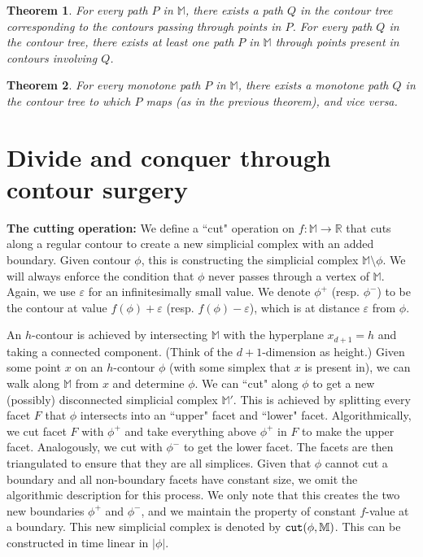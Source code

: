 \documentclass[11pt]{article}
\newtheorem{theorem}{Theorem}
\theoremstyle{definition}
\newcommand{\MM}{\mathbb{M}}
\newcommand{\RR}{\mathbb{R}}
\newcommand{\eps}{\varepsilon}
\newcommand{\cut}{{\tt cut}}
\begin{document}
\begin{theorem} \label{thm:carr-path} For every path $P$ in $\MM$, there exists a path $Q$ in the contour tree corresponding
to the contours passing through points in $P$.
For every path $Q$ in the contour tree, there exists at least one path $P$ in $\MM$ through points present
in contours involving $Q$.
\end{theorem}

\begin{theorem} \label{thm:carr-mono} For every monotone path $P$ in $\MM$, there exists a monotone path $Q$ in the contour tree to which $P$
maps (as in the previous theorem), and vice versa.
\end{theorem}



\section{Divide and conquer through contour surgery} \label{sec:surgery}

{\bf The cutting operation:} We define a ``cut" operation on $f:\MM \rightarrow \RR$ that cuts along a regular contour to create
a new simplicial complex with an added boundary. Given contour $\phi$, this is constructing the simplicial complex $\MM \setminus \phi$. 
We will always enforce the condition that $\phi$ never passes through a vertex of $\MM$.
Again, we use $\eps$ for an infinitesimally small value. We denote $\phi^+$ (resp. $\phi^-$) to be
the contour at value $f(\phi) + \eps$ (resp. $f(\phi) - \eps$), which is at distance $\eps$
from $\phi$. 

An $h$-contour is achieved by intersecting $\MM$ with the hyperplane $x_{d+1} = h$ and taking a connected component. (Think of the $d+1$-dimension
as height.) Given some point $x$
on an $h$-contour $\phi$ (with some simplex that $x$ is present in), we can walk along $\MM$ from $x$ and determine $\phi$.
We can ``cut" along $\phi$ to get a new (possibly) disconnected simplicial complex $\MM'$. This is achieved
by splitting every facet $F$ that $\phi$ intersects into an ``upper" facet and ``lower" facet. Algorithmically,
we cut facet $F$ with $\phi^+$ and take everything above $\phi^+$ in $F$ to make the upper facet. Analogously, we cut with $\phi^-$ to get the lower facet.
The facets are then triangulated to ensure that they are all simplices.
Given that $\phi$ cannot cut a boundary and all non-boundary facets
have constant size, we omit the algorithmic description for this process. We only note that this
creates the two new boundaries $\phi^+$ and $\phi^-$, and we maintain the property of constant $f$-value at a boundary.
This new simplicial complex is denoted by $\cut(\phi,\MM)$.
This can be constructed in time linear in $|\phi|$.
\end{document}
